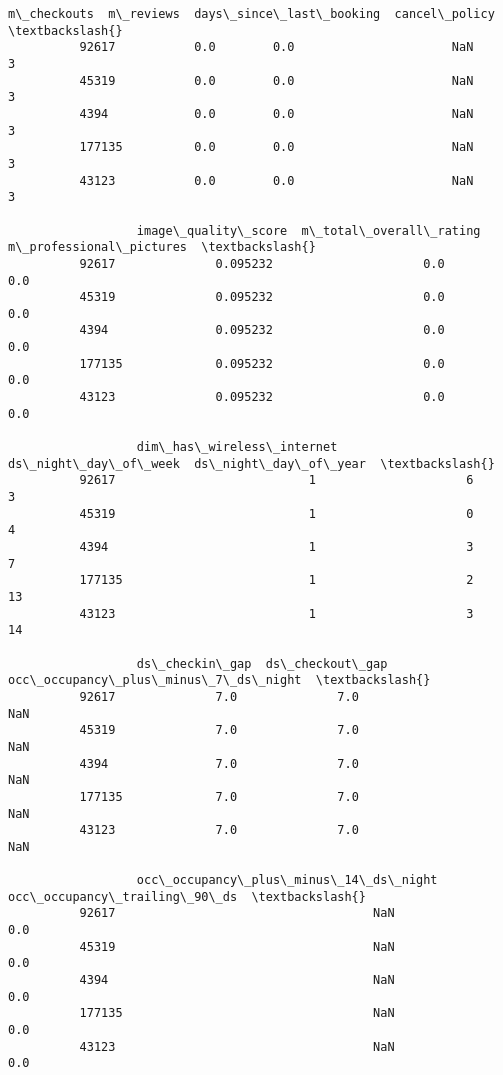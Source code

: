 \documentclass[11pt]{article}
\begin{document}
\begin{Verbatim}[commandchars=\\\{\}]
                  m\_checkouts  m\_reviews  days\_since\_last\_booking  cancel\_policy  \textbackslash{}
          92617           0.0        0.0                      NaN              3   
          45319           0.0        0.0                      NaN              3   
          4394            0.0        0.0                      NaN              3   
          177135          0.0        0.0                      NaN              3   
          43123           0.0        0.0                      NaN              3   
          
                  image\_quality\_score  m\_total\_overall\_rating  m\_professional\_pictures  \textbackslash{}
          92617              0.095232                     0.0                      0.0   
          45319              0.095232                     0.0                      0.0   
          4394               0.095232                     0.0                      0.0   
          177135             0.095232                     0.0                      0.0   
          43123              0.095232                     0.0                      0.0   
          
                  dim\_has\_wireless\_internet  ds\_night\_day\_of\_week  ds\_night\_day\_of\_year  \textbackslash{}
          92617                           1                     6                     3   
          45319                           1                     0                     4   
          4394                            1                     3                     7   
          177135                          1                     2                    13   
          43123                           1                     3                    14   
          
                  ds\_checkin\_gap  ds\_checkout\_gap  occ\_occupancy\_plus\_minus\_7\_ds\_night  \textbackslash{}
          92617              7.0              7.0                                  NaN   
          45319              7.0              7.0                                  NaN   
          4394               7.0              7.0                                  NaN   
          177135             7.0              7.0                                  NaN   
          43123              7.0              7.0                                  NaN   
          
                  occ\_occupancy\_plus\_minus\_14\_ds\_night  occ\_occupancy\_trailing\_90\_ds  \textbackslash{}
          92617                                    NaN                           0.0   
          45319                                    NaN                           0.0   
          4394                                     NaN                           0.0   
          177135                                   NaN                           0.0   
          43123                                    NaN                           0.0   
          

\end{Verbatim}
\end{document}
